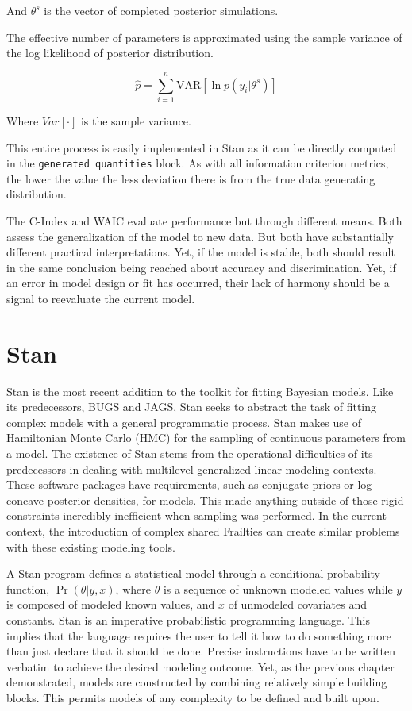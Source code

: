 And $\theta^s$ is the vector of completed posterior simulations. 

The effective number of parameters is approximated using the sample variance of the log likelihood of posterior distribution.

$$ \hat{p} = \sum^n_{i=1} \text{VAR}[\ln p(y_i|\theta^s)] $$

Where $Var[\cdot]$ is the sample variance.

This entire process is easily implemented in Stan as it can be directly computed in the \lstinline{generated quantities} block\cite{Vehtari2014}. As with all information criterion metrics, the lower the value the less deviation there is from the true data generating distribution. 

The C-Index and WAIC evaluate performance but through different means. Both assess the generalization of the model to new data. But both have substantially different practical interpretations. Yet, if the model is stable, both should result in the same conclusion being reached about accuracy and discrimination. Yet, if an error in model design or fit has occurred, their lack of harmony should be a signal to reevaluate the current model. 




\section*{Stan}

Stan is the most recent addition to the toolkit for fitting Bayesian models. Like its predecessors, BUGS and JAGS, Stan seeks to abstract the task of fitting complex models with a general programmatic process. Stan makes use of Hamiltonian Monte Carlo (HMC) for the sampling of continuous parameters from a model. The existence of Stan stems from the operational difficulties of its predecessors in dealing with multilevel generalized linear modeling contexts. These software packages have requirements, such as conjugate priors or log-concave posterior densities, for models. This made anything outside of those rigid constraints incredibly inefficient when sampling was performed. In the current context, the introduction of complex shared Frailties can create similar problems with these existing modeling tools. 

A Stan program defines a statistical model through a conditional probability function, $\Pr(\theta|y,x)$, where $\theta$ is a sequence of unknown modeled values while $y$ is composed of modeled known values, and $x$ of unmodeled covariates and constants\cite{StanDevelopmentTeam2016}. Stan is an imperative probabilistic programming language. This implies that the language requires the user to tell it how to do something more than just declare that it should be done. Precise instructions have to be written verbatim to achieve the desired modeling outcome. Yet, as the previous chapter demonstrated, models are constructed by combining relatively simple building blocks. This permits models of any complexity to be defined and built upon.


